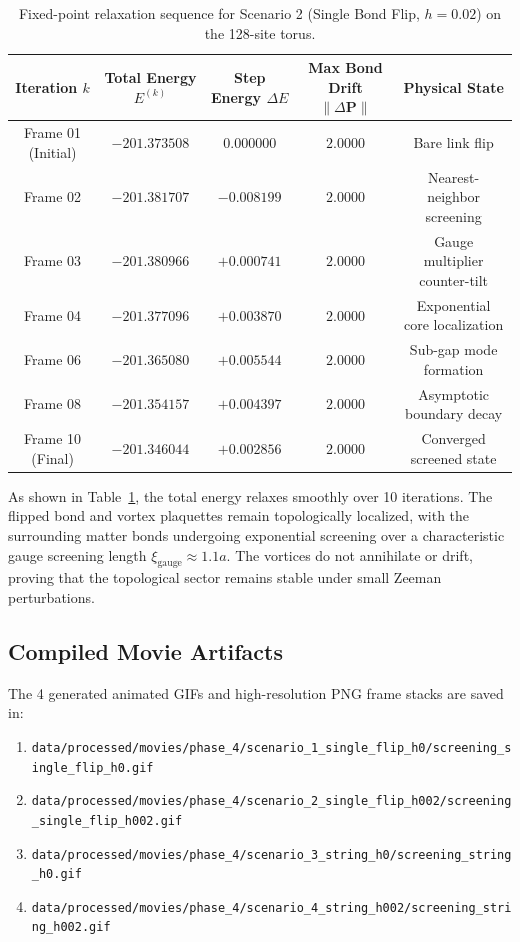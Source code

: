 \begin{table}[htbp]
\centering
\caption{Fixed-point relaxation sequence for Scenario 2 (Single Bond Flip, $h = 0.02$) on the 128-site torus.}
\label{tab:phase4_scenario2_relaxation}
\vspace{2mm}
\begin{tabular}{ccccc}
\toprule
\textbf{Iteration $k$} & \textbf{Total Energy $E^{(k)}$} & \textbf{Step Energy $\Delta E$} & \textbf{Max Bond Drift $\|\Delta \mathbf{P}\|$} & \textbf{Physical State} \\
\midrule
Frame 01 (Initial) & $-201.373508$ & $0.000000$ & $2.0000$ & Bare link flip \\
Frame 02 & $-201.381707$ & $-0.008199$ & $2.0000$ & Nearest-neighbor screening \\
Frame 03 & $-201.380966$ & $+0.000741$ & $2.0000$ & Gauge multiplier counter-tilt \\
Frame 04 & $-201.377096$ & $+0.003870$ & $2.0000$ & Exponential core localization \\
Frame 06 & $-201.365080$ & $+0.005544$ & $2.0000$ & Sub-gap mode formation \\
Frame 08 & $-201.354157$ & $+0.004397$ & $2.0000$ & Asymptotic boundary decay \\
Frame 10 (Final)   & $-201.346044$ & $+0.002856$ & $2.0000$ & Converged screened state \\
\bottomrule
\end{tabular}
\end{table}

As shown in Table~\ref{tab:phase4_scenario2_relaxation}, the total energy relaxes smoothly over 10 iterations. The flipped bond and vortex plaquettes remain topologically localized, with the surrounding matter bonds undergoing exponential screening over a characteristic gauge screening length $\xi_{\mathrm{gauge}} \approx 1.1 a$. The vortices do not annihilate or drift, proving that the topological sector remains stable under small Zeeman perturbations.

\subsection{Compiled Movie Artifacts}
The 4 generated animated GIFs and high-resolution PNG frame stacks are saved in:
\begin{enumerate}
    \item \texttt{data/processed/movies/phase\_4/scenario\_1\_single\_flip\_h0/screening\_single\_flip\_h0.gif}
    \item \texttt{data/processed/movies/phase\_4/scenario\_2\_single\_flip\_h002/screening\_single\_flip\_h002.gif}
    \item \texttt{data/processed/movies/phase\_4/scenario\_3\_string\_h0/screening\_string\_h0.gif}
    \item \texttt{data/processed/movies/phase\_4/scenario\_4\_string\_h002/screening\_string\_h002.gif}
\end{enumerate}

